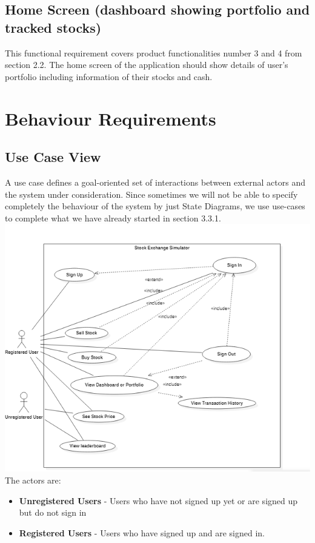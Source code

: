 \documentclass[12 pt, a4paper]{report}
\begin{document}
	
	\subsection{Home Screen (dashboard showing portfolio and tracked stocks)}
	This functional requirement covers product functionalities number 3 and 4 from section 2.2. The home screen of the application should show details of user's portfolio including information of their stocks and cash.

	\section {Behaviour Requirements}

	\subsection {Use Case View}
	A use case defines a goal-oriented set of interactions between external actors and the system under consideration. Since sometimes we will not be able to specify completely the behaviour of the system by just State Diagrams, we use use-cases to complete what we have already started in section 3.3.1. 
\includegraphics{usecase}
The actors are:
\begin{itemize}
\item \textbf{Unregistered Users} - Users who have not signed up yet or are signed up but do not sign in
\item \textbf{Registered Users} - Users who have signed up and are signed in.
\end{itemize}
\end{document}
